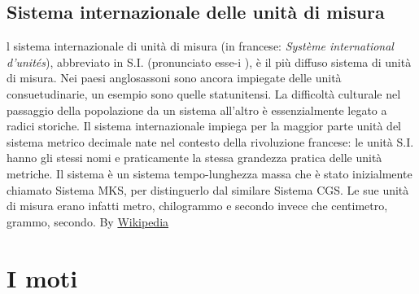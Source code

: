 \documentclass{book}
\begin{document}
\section{Sistema internazionale delle unità di misura}
l sistema internazionale di unità di misura (in francese: \textit{Système international d'unités}), abbreviato in S.I. (pronunciato esse-i
), è il più diffuso sistema di unità di misura. Nei paesi anglosassoni sono ancora impiegate delle unità consuetudinarie, un esempio sono quelle statunitensi.
La difficoltà culturale nel passaggio della popolazione da un sistema all'altro è essenzialmente legato a radici storiche. Il sistema internazionale impiega per la maggior parte unità del sistema metrico decimale nate nel contesto della rivoluzione francese: le unità S.I. hanno gli stessi nomi e praticamente la stessa grandezza pratica delle unità metriche. Il sistema è un sistema tempo-lunghezza massa che è stato inizialmente chiamato Sistema MKS, per distinguerlo dal similare Sistema CGS. Le sue unità di misura erano infatti metro, chilogrammo e secondo invece che centimetro, grammo, secondo. By \href{https://it.wikipedia.org/wiki/Sistema_internazionale_di_unità_di_misura}{Wikipedia}
\chapter{I moti}
\end{document}
